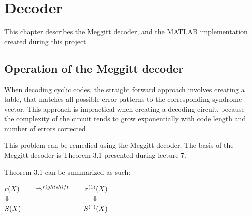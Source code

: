 \documentclass[Main]{subfiles}
\begin{document}


\chapter{Decoder}

This chapter describes the Meggitt decoder, and the MATLAB implementation created during this project.

\section{Operation of the Meggitt decoder} \label{sec:MeggitOperation}

When decoding cyclic codes, the straight forward approach involves creating a table, that matches all possible error patterns to the corresponding syndrome vector. This approach is impractical when creating a decoding circuit, because the complexity of the circuit tends to grow exponentially with code length and number of errors corrected \cite{lec7}.

This problem can be remedied using the Meggitt decoder. The basis of the Meggitt decoder is Theorem 3.1 presented during lecture 7\cite{lec7}.

\noindent
{}

Theorem 3.1 can be summarized as such:

\begin{center}

$ r(X) \hspace*{2em}  \Rightarrow^{rightshift} \hspace*{2em} r^{(1)}(X)$ \\
$ \Downarrow \hspace*{12em} \Downarrow$ \\
$ S(X) \hspace*{9em} S^{(1)}(X)$ \\
\end{center}
\end{document}
